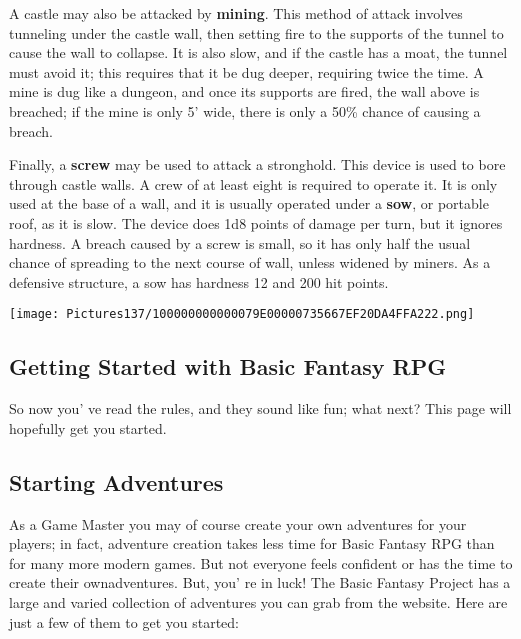 \documentclass[a4paper,twoside,openany,10pt]{book}
\begin{document}
\begin{multicols}{2}
A castle may also be attacked by \textbf{mining}. This method of attack involves tunneling under the castle wall, then setting fire to the supports of the tunnel to cause the wall to collapse. It is also slow, and if the castle has a moat, the tunnel must avoid it; this requires that it be dug deeper, requiring twice the time. A mine is dug like a dungeon, and once its supports are fired, the wall above is breached; if the mine is only 5' wide, there is only a 50\% chance of causing a breach.

Finally, a \textbf{screw} may be used to attack a stronghold. This device is used to bore through castle walls. A crew of at least eight is required to operate it. It is only used at the base of a wall, and it is usually operated under a \textbf{sow}, or portable roof, as it is slow. The device does 1d8 points of damage per turn, but it ignores hardness. A breach caused by a screw is small, so it has only half the usual chance of spreading to the next course of wall, unless widened by miners. As a defensive structure, a sow has hardness 12 and 200 hit points. 
\end{multicols}

\pagebreak

\begin{center}
	\texttt{[image: Pictures137/100000000000079E00000735667EF20DA4FFA222.png]} 
\end{center}

\pagebreak

\subsection{Getting Started with Basic Fantasy RPG}\label{getting-started-with-basic-fantasy-rpg}

So now you' ve read the rules, and they sound like fun;
what next? This page will hopefully get you started.

\subsection{Starting Adventures}\label{starting-adventures}

As a Game Master you may of course create your own adventures for your players; in fact, adventure creation takes less time for Basic Fantasy RPG than for many more modern games. But not everyone feels confident or has the time to create their ownadventures. But, you' re  in luck! The Basic Fantasy Project has a large and varied collection of adventures you can grab from the website. Here are just a few of them to get you started:
\end{document}
